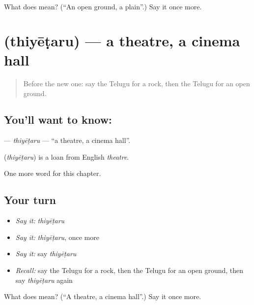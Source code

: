 \begin{tcolorbox}[breakable,colback=teal!4,colframe=teal!35!black,title={Before you move on}]
What does  mean? (\textquotedblleft{}An open ground, a plain\textquotedblright{}.) Say it once more.
\end{tcolorbox}
\section[\texorpdfstring{\te{థియేటరు} (thiyēṭaru)}{థియేటరు (thiyēṭaru)}]{ (thiyēṭaru) — a theatre, a cinema hall}

\label{lesson:TE-C215-thiyetaru}



\begin{quote}
Before the new one: say the Telugu for a rock, then the Telugu for an open ground.
\end{quote}

\subsection*{You'll want to know: }
\textbf{} — \emph{thiyēṭaru} — \textquotedblleft{}a theatre, a cinema hall\textquotedblright{}.

\begin{cousinweb}
\textbf{} (\emph{thiyēṭaru}) is a loan from English \emph{theatre}.
\end{cousinweb}

\begin{grammarlens}[title={What you've built}]
One more word for this chapter.
\end{grammarlens}

\subsection*{Your turn}
\begin{itemize}
\raggedright
  \item \emph{Say it:} \emph{thiyēṭaru}
  \item \emph{Say it:} \emph{thiyēṭaru}, once more
  \item \emph{Say it:} say \emph{thiyēṭaru}
  \item \emph{Recall:} say the Telugu for a rock, then the Telugu for an open ground, then say \emph{thiyēṭaru} again
\end{itemize}

\begin{tcolorbox}[breakable,colback=teal!4,colframe=teal!35!black,title={Before you move on}]
What does  mean? (\textquotedblleft{}A theatre, a cinema hall\textquotedblright{}.) Say it once more.
\end{tcolorbox}
